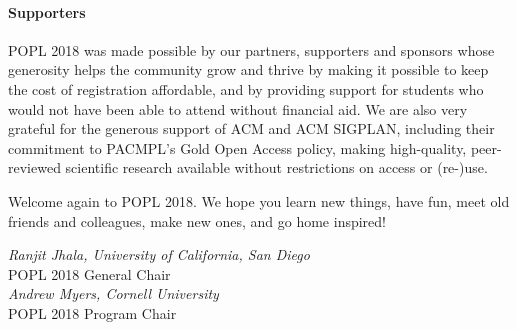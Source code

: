 \paragraph{Supporters}
%
POPL 2018 was made possible by our partners, supporters
and sponsors whose generosity helps the community grow
and thrive by making it possible to keep the cost of
registration affordable, and by providing support for
students who would not have been able to attend without
financial aid.
%
We are also very grateful for the generous support of
ACM and ACM SIGPLAN, including their commitment to
PACMPL's Gold Open Access policy, making high-quality,
peer-reviewed scientific research available without
restrictions on access or (re-)use.

\medskip
Welcome again to POPL 2018. We hope you learn new things,
have fun, meet old friends and colleagues, make new
ones, and go home inspired!

\begin{flushright}
\textit{Ranjit Jhala, University of California, San Diego} \\
POPL 2018 General Chair
\medskip \\
\textit{Andrew Myers, Cornell University} \\
POPL 2018 Program Chair
\medskip \\
\end{flushright}




\newpage
